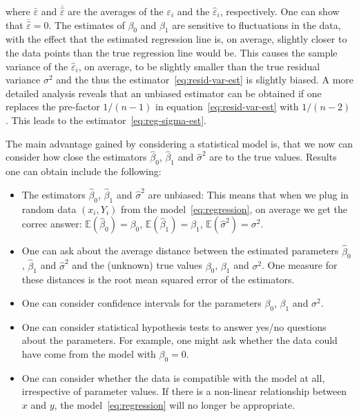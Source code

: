 \documentclass[
  a4paper,
]{article}
\theoremstyle{definition}
\theoremstyle{definition}
\theoremstyle{definition}
\theoremstyle{definition}
\theoremstyle{remark}
\begin{document}
where \(\bar\varepsilon\) and \(\overline{\hat\varepsilon}\) are the averages of the
\(\varepsilon_i\) and the \(\hat\varepsilon_i\), respectively. One can show that
\(\overline{\hat\varepsilon} = 0\). The estimates of \(\beta_0\) and \(\beta_1\) are
sensitive to fluctuations in the data, with the effect that the
estimated regression line is, on average, slightly closer to the data
points than the true regression line would be. This causes the sample
variance of the \(\hat\varepsilon_i\), on average, to be slightly smaller than
the true residual variance \(\sigma^2\) and the thus the
estimator~\eqref{eq:resid-var-est} is slightly biased. A more
detailed analysis reveals that an unbiased estimator can be obtained
if one replaces the pre-factor \(1/(n-1)\) in equation~\eqref{eq:resid-var-est}
with \(1/(n-2)\). This leads to the estimator~\eqref{eq:reg-sigma-est}.

The main advantage gained by considering a statistical model is, that
we now can consider how close the estimators \(\hat\beta_0\), \(\hat\beta_1\)
and \(\hat\sigma^2\) are to the true values. Results one can obtain
include the following:

\begin{itemize}
\item
  The estimators \(\hat\beta_0\), \(\hat\beta_1\) and \(\hat\sigma^2\)
  are unbiased: This means that when we plug in random data
  \((x_i, Y_i)\) from the model~\eqref{eq:regression}, on
  average we get the correc answer: \(\mathbb{E}(\hat\beta_0) = \beta_0\),
  \(\mathbb{E}(\hat\beta_1) = \beta_1\), \(\mathbb{E}(\hat\sigma^2) = \sigma^2\).
\item
  One can ask about the average distance between the estimated
  parameters \(\hat\beta_0\), \(\hat\beta_1\) and \(\hat\sigma^2\)
  and the (unknown) true values \(\beta_0\), \(\beta_1\) and \(\sigma^2\).
  One measure for these distances is the root mean squared error
  of the estimators.
\item
  One can consider confidence intervals for the parameters
  \(\beta_0\), \(\beta_1\) and \(\sigma^2\).
\item
  One can consider statistical hypothesis tests to answer
  yes/no questions about the parameters. For example, one might ask
  whether the data could have come from the model with \(\beta_0=0\).
\item
  One can consider whether the data is compatible with the model
  at all, irrespective of parameter values. If there is a non-linear
  relationship between \(x\) and \(y\), the model~\eqref{eq:regression}
  will no longer be appropriate.
\end{itemize}
\end{document}
